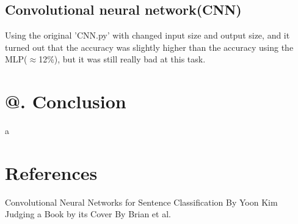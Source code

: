 \documentclass[jou,apacite, 10px]{apa6}
\makeatletter
\newcommand*{\rom}[1]{\expandafter\@slowromancap\romannumeral #1@}
\makeatother
\begin{document}
\subsection {Convolutional neural network(CNN)}
Using the original 'CNN.py' with changed input size and output size, and it turned out that the accuracy was slightly higher than the accuracy using the MLP($\approx$12\%), but it was still really bad at this task.


\section{\rom{6}. Conclusion}
a
\section{References}
\noindent Convolutional Neural Networks for Sentence Classification By Yoon Kim\\
Judging a Book by its Cover By Brian et al.
\end{document}
